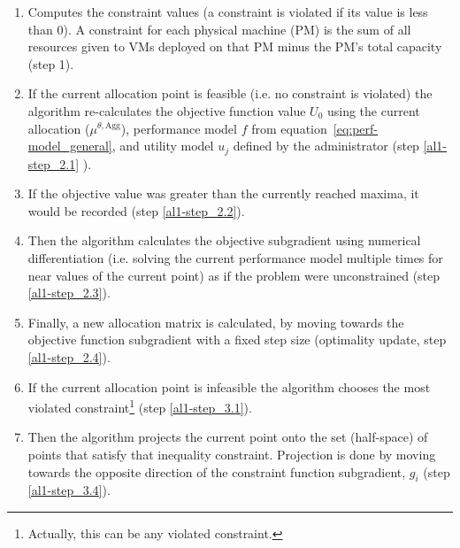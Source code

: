 \begin{enumerate}

\item  Computes the constraint values (a constraint is violated if its value is
less than 0). A constraint for each physical machine (PM) is the sum of all
resources given to VMs deployed on that PM minus the PM's total capacity (step
1).
\item  If the current allocation point is feasible (i.e. no constraint is violated) the algorithm re-calculates the objective function value $U_0$ using the current allocation ($\mu^{\theta,\text{Agg}}$), performance model $f$ from equation~\ref{eq:perf-model_general}, and utility model $u_j$ defined by the administrator (step \ref{al1-step_2.1} ). 
\item If the objective value was greater than the currently reached maxima, it would be recorded (step \ref{al1-step_2.2}).
\item Then the algorithm calculates the objective subgradient using numerical differentiation (i.e. solving the current performance model
 multiple times for near values of the current point) as if the problem were unconstrained (step \ref{al1-step_2.3}).
\item Finally, a new allocation matrix is calculated, by moving towards the objective function subgradient 
with a fixed step size (optimality update, step \ref{al1-step_2.4}).
\item If the current allocation point is infeasible the algorithm chooses the most violated constraint\footnote{Actually, this can be any violated constraint.} (step \ref{al1-step_3.1}).
\item Then the algorithm projects the current point onto the set (half-space) of points that satisfy that inequality constraint. 
 Projection is done by moving towards the opposite direction of the constraint function subgradient, $g_i$ (step \ref{al1-step_3.4}).

\end{enumerate}
